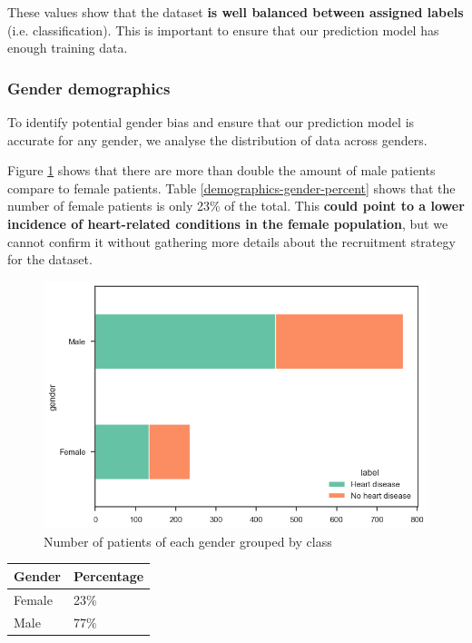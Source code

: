 These values show that the dataset \textbf{is well balanced between assigned labels} (i.e. classification). This
is important to ensure that our prediction model has enough training data.

\subsubsection{Gender demographics}

To identify potential gender bias and ensure that our prediction model is accurate for any gender, we analyse
the distribution of data across genders.

Figure \ref{demographics-gender-target-count} shows that there are more than double the amount of male patients
compare to female patients. Table \ref{demographics-gender-percent} shows that the number of female patients is
only 23\% of the total. This \textbf{could point to a lower incidence of heart-related conditions in the female population},
but we cannot confirm it without gathering more details about the recruitment strategy for the dataset.
    
\begin{figure}
    \caption{Number of patients of each gender grouped by class}\label{demographics-gender-target-count}
    \centering
    \includegraphics[width=\linewidth]{media/demographics-03-gender-target-count.png}
\end{figure}

\small
\begin{tabularx}{\linewidth}{ | X | X |}
    \caption{Distribution of patients of each gender}\label{demographics-gender-percent} \\
    \hline
    \textbf{Gender} & \textbf{Percentage}\\
    \hline
    Female & 23\% \\
    \hline
    Male & 77\% \\
    \hline
\end{tabularx}
\normalsize

